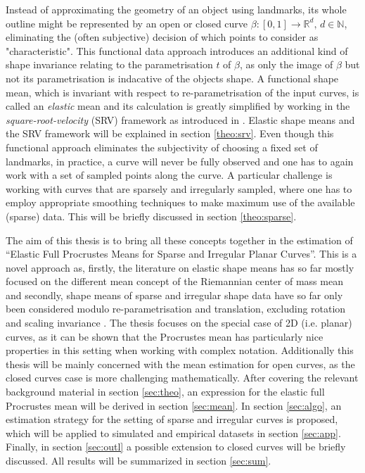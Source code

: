 Instead of approximating the geometry of an object using landmarks, its whole
outline might be represented by an open or closed curve $\beta : [0,1]
\rightarrow \mathbb{R}^d,\, d \in \mathbb{N}$, eliminating the (often
subjective) decision of which points to consider as "characteristic".
This functional data approach introduces an additional kind of shape invariance
relating to the parametrisation $t$ of $\beta$, as only the image of
$\beta$ but not its parametrisation is indacative of the objects shape.
A functional shape mean, which is invariant with respect to re-parametrisation
of the input curves, is called an \textit{elastic} mean and its calculation is
greatly simplified by working in the \textit{square-root-velocity} (SRV)
framework as introduced in \cite{SrivastavaEtAl2011}.
Elastic shape means and the SRV framework will be explained in section
\ref{theo:srv}.
Even though this functional approach eliminates the subjectivity of choosing a
fixed set of landmarks, in practice, a curve will never be fully observed and
one has to again work with a set of sampled points along the curve. 
A particular challenge is working with curves that are sparsely and irregularly
sampled, where one has to employ appropriate smoothing techniques to make
maximum use of the available (sparse) data.
This will be briefly discussed in section \ref{theo:sparse}.

The aim of this thesis is to bring all these concepts together in the
estimation of \enquote{Elastic Full Procrustes Means for Sparse and Irregular
Planar Curves}. 
This is a novel approach as, firstly, the literature on elastic shape means has
so far mostly focused on the different mean concept of the Riemannian center of
mass mean \parencite{SrivastavaEtAl2011} and secondly, shape means of
sparse and irregular shape data have so far only been considered modulo
re-parametrisation and translation, excluding rotation and scaling invariance
\parencite{Steyer2021}.
The thesis focuses on the special case of 2D (i.e. planar) curves, as it can be
shown that the Procrustes mean has particularly nice properties in this
setting when working with complex notation.
Additionally this thesis will be mainly concerned with the mean estimation for
open curves, as the closed curves case is more challenging mathematically.
After covering the relevant background material  in section \ref{sec:theo}, an
expression for the elastic full Procrustes mean will be derived in section
\ref{sec:mean}.
In section \ref{sec:algo}, an estimation strategy for the setting of sparse and
irregular curves is proposed, which will be applied to simulated and empirical
datasets in section \ref{sec:app}.
Finally, in section \ref{sec:outl} a possible extension to closed curves will
be briefly discussed.
All results will be summarized in section \ref{sec:sum}.

\newpage
